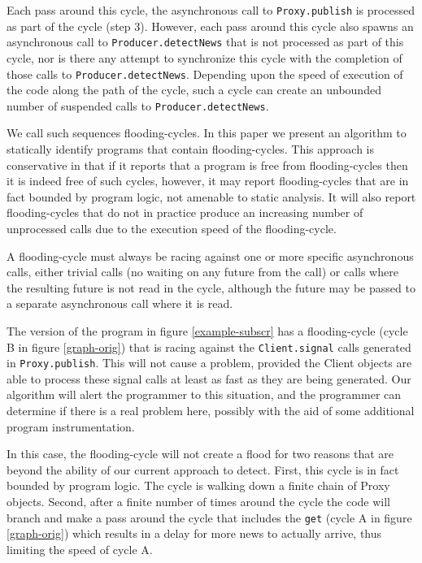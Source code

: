 \documentclass[12pt]{article}%
\begin{document}
\noindent
Each pass around this cycle, the asynchronous call to \lstinline{Proxy.publish} is processed as part of the cycle (step 3).
However, each pass around this cycle also spawns an asynchronous call to  \lstinline{Producer.detectNews} that is not processed as part of this cycle,
nor is there any attempt to synchronize this cycle with the completion of those calls to  \lstinline{Producer.detectNews}.
Depending upon the speed of
execution of the code along the path of the cycle, such a cycle can create an unbounded number of suspended calls to
\lstinline{Producer.detectNews}.

We call such sequences flooding-cycles. In this paper we present an algorithm to statically identify
programs that contain flooding-cycles. This approach is conservative in that if it reports that a program is free from
flooding-cycles then it is indeed free of such cycles, however, it may report flooding-cycles that are in fact bounded by
program logic, not amenable to static analysis. It will also report flooding-cycles that do not in practice produce an
increasing number of unprocessed calls due to the execution speed of the flooding-cycle. 

A flooding-cycle must always be racing against one or more specific asynchronous calls, either trivial calls (no waiting on
any future from the call) or calls where the resulting future is not read in the cycle, although the future may be passed
to a separate asynchronous call where it is read.  

The version of the program in figure \ref{example-subscr} has a flooding-cycle (cycle B in figure \ref{graph-orig}) 
that is racing against the \lstinline{Client.signal} calls
generated in \lstinline{Proxy.publish}. This will not cause a problem, provided the Client objects are able to process these signal
calls at least as fast as they are being generated. Our algorithm will alert the programmer to this situation, and the
programmer can determine if there is a real problem here, possibly with the aid of some additional program
instrumentation.  

In this case, the flooding-cycle will not create a flood for two reasons that are beyond the ability of our current approach to detect.
First, this cycle is in fact bounded by program logic. The cycle is walking down a finite chain of Proxy objects.
Second, after a finite number of times around the cycle the code will branch and make a pass around the cycle that includes the 
\lstinline{get}
(cycle A in figure \ref{graph-orig})
which results in a delay for more news to actually arrive, thus limiting the speed of cycle A.
\end{document}
